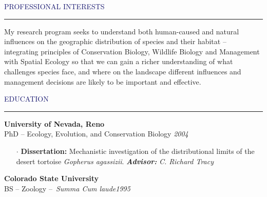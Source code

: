 \documentclass{resume} %
\renewenvironment{rSection}[1]{
\sectionskip
\textcolor{MidnightBlue}{\MakeUppercase{#1}}
\sectionlineskip
\hrule
\begin{list}{}{
\setlength{\leftmargin}{1.5em}
}
\item[]
}{
\end{list}
}
\begin{document}
\begin{rSection}{Professional Interests}
My research program seeks to understand both human-caused and natural influences on the geographic distribution of species and their habitat – integrating principles of Conservation Biology, Wildlife Biology and Management with Spatial Ecology so that we can gain a richer understanding of what challenges species face, and where on the landscape different influences and management decisions are likely to be important and effective. 
\end{rSection}


\begin{rSection}{Education}

{\bf University of Nevada, Reno} \hfill
\\ PhD – Ecology, Evolution, and Conservation Biology \hfill {\em 2004} 
\begin{itemize}
\item[$\cdot$] \textbf{Dissertation:} Mechanistic investigation of the distributional limits of the desert tortoise \textit{Gopherus agassizii}. \textbf{\textit{Advisor:}} \textit{C. Richard Tracy} \hfill
\end{itemize}
{\bf Colorado State University} \hfill
\\  BS – Zoology – \textit{Summa Cum laude}\hfill {\em 1995} 
\end{rSection}
\end{document}
